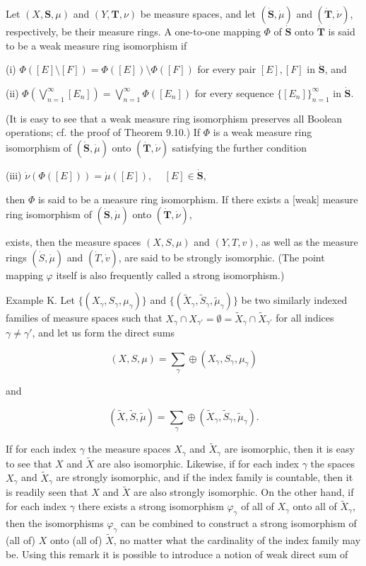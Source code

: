 Let $(X, \mathbf{S}, \mu)$ and $(Y, \mathbf{T}, \nu)$ be measure spaces, and let $(\dot{\mathbf{S}}, \dot{\mu})$ and $(\dot{\mathbf{T}}, \dot{\nu})$, respectively, be their measure rings. A one-to-one mapping $\Phi$ of $\dot{\mathbf{S}}$ onto $\dot{\mathbf{T}}$ is said to be a weak measure ring isomorphism if

(i) $\Phi([E] \setminus [F]) = \Phi([E]) \setminus \Phi([F])$ for every pair $[E], [F]$ in $\dot{\mathbf{S}}$, and

(ii) $\Phi(\bigvee_{n=1}^{\infty} [E_n]) = \bigvee_{n=1}^{\infty} \Phi([E_n])$ for every sequence $\{[E_n]\}_{n=1}^{\infty}$ in $\dot{\mathbf{S}}$.

(It is easy to see that a weak measure ring isomorphism preserves all Boolean operations; cf. the proof of Theorem 9.10.) If $\Phi$ is a weak measure ring isomorphism of $(\dot{\mathbf{S}}, \dot{\mu})$ onto $(\dot{\mathbf{T}}, \dot{\nu})$ satisfying the further condition

(iii) $\dot{\nu}(\Phi([E])) = \dot{\mu}([E])$, $\quad [E] \in \dot{\mathbf{S}}$,

then $\Phi$ is said to be a measure ring isomorphism. If there exists a [weak] measure ring isomorphism of $(\dot{\mathbf{S}}, \dot{\mu})$ onto $(\dot{\mathbf{T}}, \dot{\nu})$,

exists, then the measure spaces $(X, S, \mu)$ and $(Y, T, v)$, as well as the measure rings $(\dot{S}, \dot{\mu})$ and $(\dot{T}, \dot{v})$, are said to be strongly isomorphic. (The point mapping $\varphi$ itself is also frequently called a strong isomorphism.)

Example K. Let $\{(X_{\gamma}, S_{\gamma}, \mu_{\gamma})\}$ and $\{(\tilde{X}_{\gamma}, \tilde{S}_{\gamma}, \tilde{\mu}_{\gamma})\}$ be two similarly indexed families of measure spaces such that $X_{\gamma} \cap X_{\gamma'} = \emptyset = \tilde{X}_{\gamma} \cap \tilde{X}_{\gamma'}$ for all indices $\gamma \neq \gamma'$, and let us form the direct sums

$$(X, S, \mu) = \sum_{\gamma} \oplus (X_{\gamma}, S_{\gamma}, \mu_{\gamma})$$

and

$$(\tilde{X}, \tilde{S}, \tilde{\mu}) = \sum_{\gamma} \oplus (\tilde{X}_{\gamma}, \tilde{S}_{\gamma}, \tilde{\mu}_{\gamma}).$$

If for each index $\gamma$ the measure spaces $X_{\gamma}$ and $\tilde{X}_{\gamma}$ are isomorphic, then it is easy to see that $X$ and $\tilde{X}$ are also isomorphic. Likewise, if for each index $\gamma$ the spaces $X_{\gamma}$ and $\tilde{X}_{\gamma}$ are strongly isomorphic, and if the index family is countable, then it is readily seen that $X$ and $\tilde{X}$ are also strongly isomorphic. On the other hand, if for each index $\gamma$ there exists a strong isomorphism $\varphi_{\gamma}$ of all of $X_{\gamma}$ onto all of $\tilde{X}_{\gamma}$, then the isomorphisms $\varphi_{\gamma}$ can be combined to construct a strong isomorphism of (all of) $X$ onto (all of) $\tilde{X}$, no matter what the cardinality of the index family may be. Using this remark it is possible to introduce a notion of weak direct sum of

